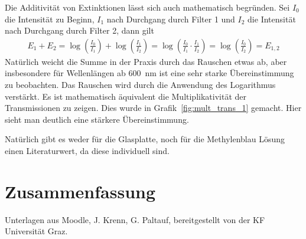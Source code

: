 \documentclass{article}
\begin{document}
Die Additivität von Extinktionen lässt sich auch mathematisch begründen. Sei $I_0$ die Intensität zu Beginn, $I_1$ nach Durchgang durch Filter 1 und $I_2$ die Intensität nach Durchgang durch Filter 2, dann gilt
\begin{align*}
E_1 + E_2 = \log\left(\frac{I_0}{I_1}\right) + \log\left(\frac{I_1}{I_2}\right) = \log\left(\frac{I_0}{I_1}\cdot \frac{I_1}{I_2}\right) = \log\left(\frac{I_0}{I_2}\right) = E_{1,2}
\end{align*}
Natürlich weicht die Summe in der Praxis durch das Rauschen etwas ab, aber insbesondere für Wellenlängen ab 600~nm ist eine sehr starke Übereinstimmung zu beobachten. Das Rauschen wird durch die Anwendung des Logarithmus verstärkt. Es ist mathematisch äquivalent die Multiplikativität der Transmissionen zu zeigen. Dies wurde in Grafik~\ref{fig:mult_trans_1} gemacht. Hier sieht man deutlich eine stärkere Übereinstimmung.

Natürlich gibt es weder für die Glasplatte, noch für die Methylenblau Lösung einen Literaturwert, da diese individuell sind.







\section{Zusammenfassung}






\begin{thebibliography}{9}
 Unterlagen aus Moodle, J. Krenn, G. Paltauf, bereitgestellt von der KF Universität Graz.
\end{thebibliography}






\lstset{
extendedchars=\true,
inputencoding=utf8
}

%

%


%
\end{document}
